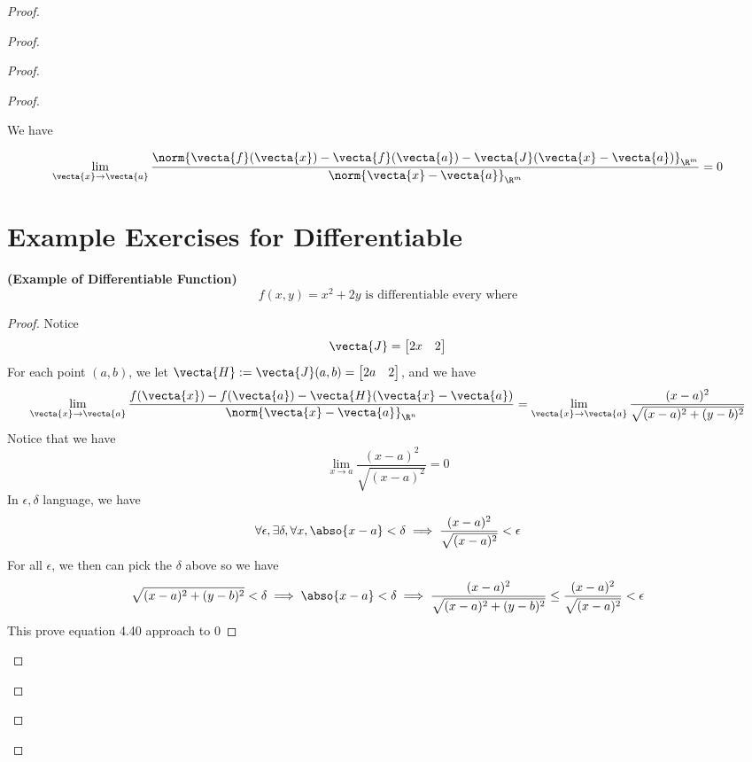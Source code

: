 \documentclass{report}
\begin{document}
\begin{proof}
\begin{proof}
\begin{proof}
\begin{proof}
\begin{theorem}
We have

\begin{equation}
\lim_{\vecta{x}\to \vecta{a}}\frac{\norm{\vecta{f}(\vecta{x})-\vecta{f}(\vecta{a})-\vecta{J}(\vecta{x}-\vecta{a})}_{\R^m}}{\norm{\vecta{x}-\vecta{a}}_{\R^m}}=0
\end{equation}
\end{theorem}
\section{Example Exercises for Differentiable}
\begin{theorem}
\label{8.3.1}
\textbf{(Example of Differentiable Function)} 
\begin{equation}
f(x,y)=x^2+2y\text{ is differentiable every where}
\end{equation}
\end{theorem}
\begin{proof}
Notice 
\begin{equation}
\vecta{J}=\begin{bmatrix}
  2x&2
\end{bmatrix}
\end{equation}
For each point $(a,b)$, we let $\vecta{H}:=\vecta{J}(a,b)=\begin{bmatrix}
  2a&2
\end{bmatrix}$, and we have
\begin{equation}
\lim_{\vecta{x}\to \vecta{a}}\frac{f(\vecta{x})-f(\vecta{a})-\vecta{H}(\vecta{x}-\vecta{a})}{\norm{\vecta{x}-\vecta{a}}_{\R^n}}=\lim_{\vecta{x}\to \vecta{a}}\frac{(x-a)^2}{\sqrt{(x-a)^2+(y-b)^2}}
\end{equation}
Notice that we have
\begin{equation}
\lim_{x\to a}\frac{(x-a)^2}{\sqrt{(x-a)^2} }=0
\end{equation}
In $\epsilon,\delta$ language, we have
\begin{equation}
\forall \epsilon,\exists \delta, \forall x, \abso{x-a}<\delta \implies \frac{(x-a)^2}{\sqrt{(x-a)^2} }<\epsilon  
\end{equation}
For all $\epsilon $, we then can pick the $\delta$ above so we have
\begin{equation}
\sqrt{(x-a)^2+(y-b)^2}<\delta \implies \abso{x-a}<\delta\implies \frac{(x-a)^2}{\sqrt{(x-a)^2+(y-b)^2} }\leq  \frac{(x-a)^2}{\sqrt{(x-a)^2} } <\epsilon 
\end{equation}
This prove equation 4.40 approach to 0
\end{proof}
\begin{theorem}

\end{theorem}
\end{proof}
\end{proof}
\end{proof}
\end{proof}
\end{document}
